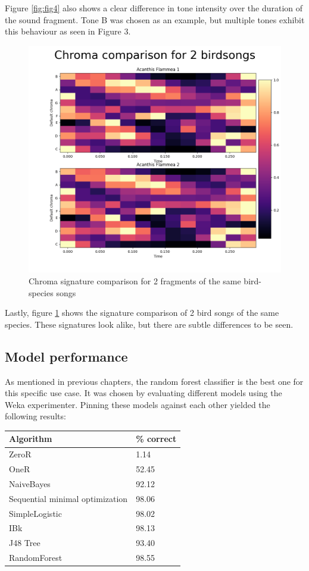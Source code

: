 \documentclass[
]{article}
\begin{document}
Figure \ref{fig:fig4} also shows a clear difference in tone intensity
over the duration of the sound fragment. Tone B was chosen as an
example, but multiple tones exhibit this behaviour as seen in Figure 3.

\newpage

\begin{figure}
\centering\includegraphics[width=\linewidth]{../figures/chroma_comparison_same.png}
\caption{Chroma signature comparison for 2 fragments of the same bird-species songs}
\label{fig:fig5}
\end{figure}

Lastly, figure \ref{fig:fig5} shows the signature comparison of 2 bird
songs of the same species. These signatures look alike, but there are
subtle differences to be seen.

\newpage

\hypertarget{model-performance}{%
\subsection{Model performance}\label{model-performance}}

As mentioned in previous chapters, the random forest classifier is the
best one for this specific use case. It was chosen by evaluating
different models using the Weka experimenter. Pinning these models
against each other yielded the following results:

\begin{longtable}[]{@{}ll@{}}
\toprule
Algorithm & \% correct \\
\midrule
\endhead
ZeroR & 1.14 \\
OneR & 52.45 \\
NaiveBayes & 92.12 \\
Sequential minimal optimization & 98.06 \\
SimpleLogistic & 98.02 \\
IBk & 98.13 \\
J48 Tree & 93.40 \\
RandomForest & 98.55 \\
\bottomrule
\end{longtable}
\end{document}
